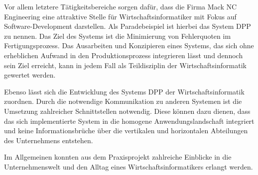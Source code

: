 \documentclass[
    type=Prakikumsbericht,
    status=draft, %
    language=german, %
    bibengine=bibtex,
]{unibwm-inf-thesis}
\begin{document}
    Vor allem letztere Tätigkeitsbereiche sorgen dafür, dass die Firma Mack NC Engineering eine attraktive Stelle für Wirtschaftsinformatiker mit Fokus auf Software-Development darstellen.
    Als Paradebeispiel ist hierbei das System \ac{DPP} zu nennen.
    Das Ziel des Systems ist die Minimierung von Fehlerquoten im Fertigungsprozess.
    Das Ausarbeiten und Konzipieren eines Systems, das sich ohne erheblichen Aufwand in den Produktionsprozess integrieren lässt und dennoch sein Ziel erreicht, kann in jedem Fall als Teildisziplin der Wirtschaftsinformatik gewertet werden.

    Ebenso lässt sich die Entwicklung des Systems \ac{DPP} der Wirtschaftsinformatik zuordnen.
    Durch die notwendige Kommunikation zu anderen Systemen ist die Umsetzung zahlreicher Schnittstellen notwendig.
    Diese können dazu dienen, dass das sich implementierte System in die homogene Anwendungslandschaft integriert und keine Informationsbrüche über die vertikalen und horizontalen Abteilungen des Unternehmens entstehen.

    Im Allgemeinen konnten aus dem Praxisprojekt zahlreiche Einblicke in die Unternehmenswelt und den Alltag eines Wirtschaftsinformatikers erlangt werden.

    
    \backmatter
    
    
\end{document}
